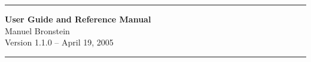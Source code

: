 \thispagestyle{empty}
\begin{center}
\vskip 5cm
\hrule
\vskip 0.5cm
{\LARGE\bf \salli User Guide and Reference Manual}\\
\vskip 1cm
{\Large Manuel Bronstein}\\
\vskip 1cm
{\Large Version 1.1.0 -- April 19, 2005}
\vskip 0.5cm
\hrule
\end{center}
\newpage
